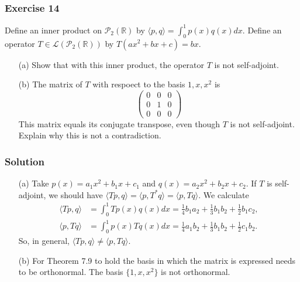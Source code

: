 \subsubsection*{Exercise 14}

Define an inner product on $\mathcal{P}_2(\mathbb{R})$ by $\langle p, q \rangle = \int_0^1 p(x) q(x) dx$.
Define an operator $T \in \mathcal{L}(\mathcal{P}_2(\mathbb{R}))$ by $T(ax^2 + bx + c) = bx$.
\begin{itemize}
    \item[(a)] Show that with this inner product, the operator $T$ is not self-adjoint.
    \item[(b)] The matrix of $T$ with respoect to the basis $1, x, x^2$ is
        \begin{equation*}
            \begin{pmatrix}
                0 & 0 & 0 \\
                0 & 1 & 0 \\
                0 & 0 & 0
            \end{pmatrix}
        \end{equation*}
        This matrix equals its conjugate transpose, even though $T$ is not self-adjoint.
        Explain why this is not a contradiction.
\end{itemize}

\subsubsection*{Solution}

\begin{itemize}
    \item[(a)] Take $p(x) = a_1 x^2 + b_1 x + c_1$ and $q(x) = a_2 x^2 + b_2 x + c_2$.
        If $T$ is self-adjoint, we should have $\langle Tp, q \rangle = \langle p, T^*q \rangle = \langle p, Tq \rangle$.
        We calculate
        \begin{equation*}
            \begin{split}
                \langle Tp, q \rangle
                    &= \int_0^1 Tp(x) q(x) dx
                    = \frac{1}{4} b_1 a_2 + \frac{1}{3} b_1 b_2 + \frac{1}{2} b_1 c_2, \\
                \langle p, Tq \rangle
                    &= \int_0^1 p(x) Tq(x) dx
                    = \frac{1}{4} a_1 b_2 + \frac{1}{3} b_1 b_2 + \frac{1}{2} c_1 b_2.
            \end{split}
        \end{equation*}
        So, in general, $\langle Tp, q \rangle \neq \langle p, Tq \rangle$.
    \item[(b)] For Theorem 7.9 to hold the basis in which the matrix is expressed needs to be orthonormal.
        The basis $\{1, x, x^2\}$ is not orthonormal.
\end{itemize}


